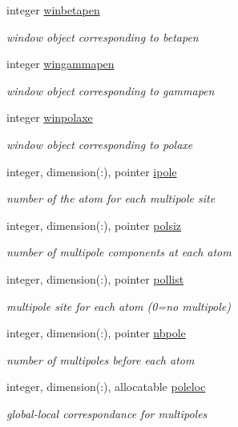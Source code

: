 \begin{DoxyCompactItemize}
integer \hyperlink{classmpole_a4b4c29022b12253618b54b274326304f}{winbetapen}
\begin{DoxyCompactList}\small\item\em window object corresponding to betapen \end{DoxyCompactList}\item 
integer \hyperlink{classmpole_a13089e182e3859dc141ef2d18574c565}{wingammapen}
\begin{DoxyCompactList}\small\item\em window object corresponding to gammapen \end{DoxyCompactList}\item 
integer \hyperlink{classmpole_a5fc1b199dda9790624e9889904207c3f}{winpolaxe}
\begin{DoxyCompactList}\small\item\em window object corresponding to polaxe \end{DoxyCompactList}\item 
integer, dimension(\-:), pointer \hyperlink{classmpole_ac184bff54a099006de6a7772285eb9f8}{ipole}
\begin{DoxyCompactList}\small\item\em number of the atom for each multipole site \end{DoxyCompactList}\item 
integer, dimension(\-:), pointer \hyperlink{classmpole_ad313a6af232574f7c741e2c9f75037de}{polsiz}
\begin{DoxyCompactList}\small\item\em number of multipole components at each atom \end{DoxyCompactList}\item 
integer, dimension(\-:), pointer \hyperlink{classmpole_a51c9cde82264984e146d7e12f305f94d}{pollist}
\begin{DoxyCompactList}\small\item\em multipole site for each atom (0=no multipole) \end{DoxyCompactList}\item 
integer, dimension(\-:), pointer \hyperlink{classmpole_a34c84581392243bd5d97966a6354d030}{nbpole}
\begin{DoxyCompactList}\small\item\em number of multipoles before each atom \end{DoxyCompactList}\item 
integer, dimension(\-:), allocatable \hyperlink{classmpole_ae846a620754e15482da112bf82192018}{poleloc}
\begin{DoxyCompactList}\small\item\em global-\/local correspondance for multipoles \end{DoxyCompactList}\item 

\end{DoxyCompactItemize}
